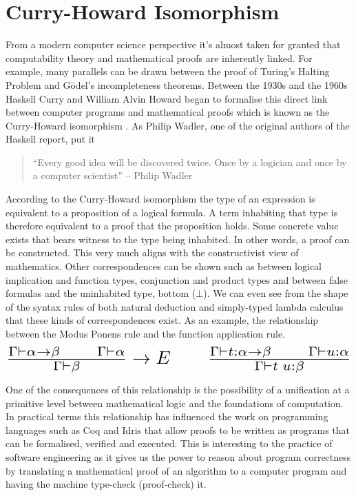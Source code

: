 \documentclass[a4paper, notitlepage]{report}
\begin{document}
\section{Curry-Howard Isomorphism}
\label{sec:org3e4c8fb}
From a modern computer science perspective it's almost taken for granted that
computability theory and mathematical proofs are inherently linked. For example,
many parallels can be drawn between the proof of Turing's Halting Problem and
Gödel's incompleteness theorems. Between the 1930s and the 1960s Haskell Curry
and William Alvin Howard began to formalise this direct link between computer
programs and mathematical proofs which is known as the Curry-Howard isomorphism
\cite{mcadams_tutor_2013}. As Philip Wadler, one of the original authors of the
Haskell report, put it \cite{strange_loop_2015,wadler_propos_2015}

\begin{quote}
``Every good idea will be discovered twice. Once by a logician and once by a
computer scientist'' -- Philip Wadler
\end{quote}

According to the Curry-Howard isomorphism the type of an expression is
equivalent to a proposition of a logical formula. A term inhabiting that type is
therefore equivalent to a proof that the proposition holds. Some concrete value
exists that bears witness to the type being inhabited. In other words, a proof
can be constructed. This very much aligns with the constructivist view of
mathematics. Other correspondences can be shown such as between logical
implication and function types, conjunction and product types and between false
formulas and the uninhabited type, bottom (\(\bot\)). We can even see from the
shape of the syntax rules of both natural deduction and simply-typed lambda
calculus that these kinds of correspondences exist. As an example, the
relationship between the Modus Ponens rule and the function application rule.
\[ \scalebox{2}{$\frac{\Gamma \vdash \alpha \rightarrow \beta \qquad \Gamma
\vdash \alpha}{\Gamma \vdash \beta} \rightarrow E \qquad \frac{\Gamma \vdash
t:\alpha \rightarrow \beta \qquad \Gamma \vdash u:\alpha}{\Gamma \vdash
t\;u:\beta}$} \]

One of the consequences of this relationship is the possibility of a unification
at a primitive level between mathematical logic and the foundations of
computation. In practical terms this relationship has influenced the work on
programming languages such as Coq and Idris that allow proofs to be written as
programs that can be formalised, verified and executed. This is interesting to
the practice of software engineering as it gives us the power to reason about
program correctness by translating a mathematical proof of an algorithm to a
computer program and having the machine type-check (proof-check) it.
\end{document}
